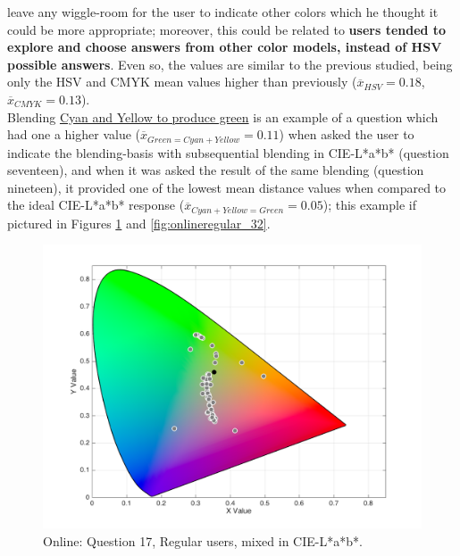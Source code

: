 \begin{itemize}
{  leave any wiggle-room for the user to indicate other colors which he thought it could be more appropriate}; moreover, this could be related to \textbf{users tended to explore and choose answers from other color
  models, instead of HSV possible answers}. Even so, the values are similar to the previous studied, being only the HSV and CMYK mean values higher than previously ($\overline{x}_{HSV} = 0.18$, $\overline{x}_{CMYK} = 0.13$).\\
  Blending \ul{Cyan and Yellow to produce green} is an example of a question which had one a higher value ($\overline{x}_{Green = Cyan + Yellow} = 0.11$) when asked the user to indicate the blending-basis with subsequential
  blending in CIE-L*a*b* (question seventeen), and when it was asked the result of the same blending (question nineteen), it provided one of the lowest mean distance values when compared to the ideal CIE-L*a*b* response
  ($\overline{x}_{Cyan + Yellow = Green} = 0.05$); this example if pictured in Figures
  \ref{fig:onlinelabregular_17} and \ref{fig:onlineregular_32}.
  \begin{figure}[!htbp]
    \centering
    \vspace{-10pt}
    \begin{minipage}{0.4\textwidth}
      \centering
      \includegraphics[width=\textwidth]{images/results/17_online_Labresponses.png}
      \caption[Online: Answers for Question 17, from regular users, mixed in CIE-L*a*b* Color Model.]{Online: Question 17, Regular users, mixed in CIE-L*a*b*.}
      \label{fig:onlinelabregular_17}
    \end{minipage}
    \begin{minipage}{0.4\textwidth}

\end{minipage}
\end{figure}
\end{itemize}

